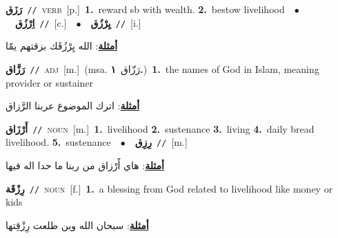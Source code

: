 \documentclass[10pt,a4paper,twoside]{article} %
\begin{document}
\begin{multicols}{2}
{\setlength\topsep{0pt}\textbf{\foreignlanguage{arabic}{رَزَق}}\ {\color{gray}\texttt{//}\color{black}}\ \textsc{verb}\ [p.]\ \textbf{1.}~reward sb with wealth.  \textbf{2.}~bestow livelihood\ \ $\bullet$\ \ \setlength\topsep{0pt}\textbf{\foreignlanguage{arabic}{اِرْزُق}}\ {\color{gray}\texttt{//}\color{black}}\ [c.]\ \ $\bullet$\ \ \setlength\topsep{0pt}\textbf{\foreignlanguage{arabic}{يِرْزُق}}\ {\color{gray}\texttt{//}\color{black}}\ [i.]\  \begin{flushright}\color{gray}\foreignlanguage{arabic}{\textbf{\underline{\foreignlanguage{arabic}{أمثلة}}}: الله يِرْزُقَك بزقتهم يمّا}\end{flushright}\color{black}} \vspace{2mm}

{\setlength\topsep{0pt}\textbf{\foreignlanguage{arabic}{رَزَّاق}}\ {\color{gray}\texttt{//}\color{black}}\ \textsc{adj}\ [m.]\ \color{gray}(msa. \foreignlanguage{arabic}{رَزّاق}~\foreignlanguage{arabic}{\textbf{١.}})\color{black}\ \textbf{1.}~the names of God in Islam, meaning provider or sustainer\  \begin{flushright}\color{gray}\foreignlanguage{arabic}{\textbf{\underline{\foreignlanguage{arabic}{أمثلة}}}: اترك الموضوع عربنا الرَّزاق}\end{flushright}\color{black}} \vspace{2mm}

{\setlength\topsep{0pt}\textbf{\foreignlanguage{arabic}{أَرْزَاق}}\ {\color{gray}\texttt{//}\color{black}}\ \textsc{noun}\ [m.]\ \textbf{1.}~livelihood  \textbf{2.}~sustenance  \textbf{3.}~living  \textbf{4.}~daily bread livelihood.  \textbf{5.}~sustenance\ \ $\bullet$\ \ \setlength\topsep{0pt}\textbf{\foreignlanguage{arabic}{رِزِق}}\ {\color{gray}\texttt{//}\color{black}}\ [m.]\  \begin{flushright}\color{gray}\foreignlanguage{arabic}{\textbf{\underline{\foreignlanguage{arabic}{أمثلة}}}: هاي أََرْزاق من ربنا ما حدا اله فيها}\end{flushright}\color{black}} \vspace{2mm}

{\setlength\topsep{0pt}\textbf{\foreignlanguage{arabic}{رِزْقَة}}\ {\color{gray}\texttt{//}\color{black}}\ \textsc{noun}\ [f.]\ \textbf{1.}~a blessing from God related to livelihood like money or kids\  \begin{flushright}\color{gray}\foreignlanguage{arabic}{\textbf{\underline{\foreignlanguage{arabic}{أمثلة}}}: سبحان الله وين طلعت رِزْقِتها}\end{flushright}\color{black}} \vspace{2mm}


\end{multicols}
\end{document}

